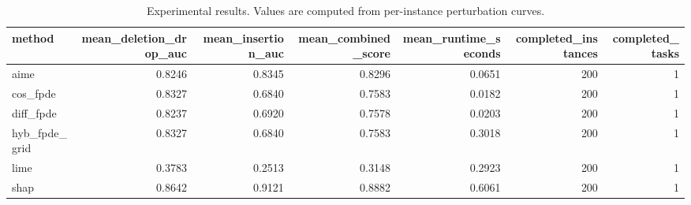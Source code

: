 \begin{table}[t]
\caption{Experimental results. Values are computed from per-instance perturbation curves.}
\label{tab:main_results_computed}
\centering
\begin{tabular}{lrrrrrr}
\toprule
method & mean\_deletion\_drop\_auc & mean\_insertion\_auc & mean\_combined\_score & mean\_runtime\_seconds & completed\_instances & completed\_tasks \\
\midrule
aime & 0.8246 & 0.8345 & 0.8296 & 0.0651 & 200 & 1 \\
cos\_fpde & 0.8327 & 0.6840 & 0.7583 & 0.0182 & 200 & 1 \\
diff\_fpde & 0.8237 & 0.6920 & 0.7578 & 0.0203 & 200 & 1 \\
hyb\_fpde\_grid & 0.8327 & 0.6840 & 0.7583 & 0.3018 & 200 & 1 \\
lime & 0.3783 & 0.2513 & 0.3148 & 0.2923 & 200 & 1 \\
shap & 0.8642 & 0.9121 & 0.8882 & 0.6061 & 200 & 1 \\
\bottomrule
\end{tabular}

\end{table}

